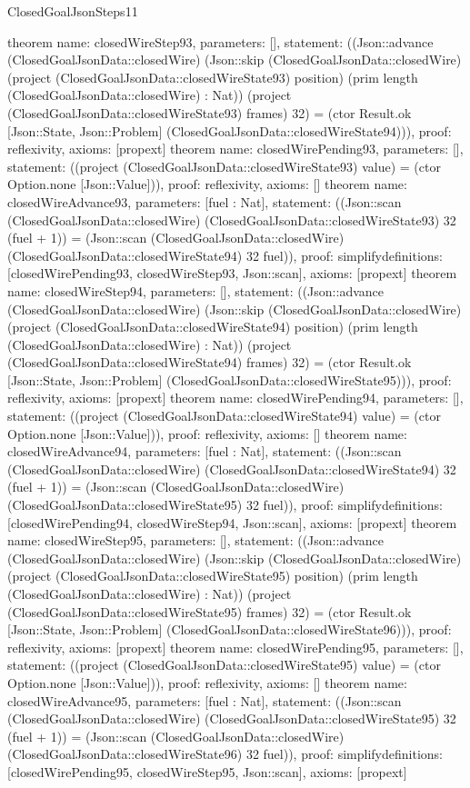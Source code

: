 \begin{lexlean}{ClosedGoalJsonSteps11}
\begin{semanticmodule}
{}
theorem{
 name: closedWireStep93, parameters: [],
 statement: ((Json::advance (ClosedGoalJsonData::closedWire) (Json::skip (ClosedGoalJsonData::closedWire) (project (ClosedGoalJsonData::closedWireState93) position) (prim length (ClosedGoalJsonData::closedWire) : Nat)) (project (ClosedGoalJsonData::closedWireState93) frames) 32) = (ctor Result.ok [Json::State, Json::Problem] (ClosedGoalJsonData::closedWireState94))), proof: reflexivity{}, axioms: [propext]
}
theorem{
 name: closedWirePending93, parameters: [],
 statement: ((project (ClosedGoalJsonData::closedWireState93) value) = (ctor Option.none [Json::Value])), proof: reflexivity{}, axioms: []
}
theorem{
 name: closedWireAdvance93, parameters: [fuel : Nat],
 statement: ((Json::scan (ClosedGoalJsonData::closedWire) (ClosedGoalJsonData::closedWireState93) 32 (fuel + 1)) = (Json::scan (ClosedGoalJsonData::closedWire) (ClosedGoalJsonData::closedWireState94) 32 fuel)), proof: simplify{definitions: [closedWirePending93, closedWireStep93, Json::scan]}, axioms: [propext]
}
theorem{
 name: closedWireStep94, parameters: [],
 statement: ((Json::advance (ClosedGoalJsonData::closedWire) (Json::skip (ClosedGoalJsonData::closedWire) (project (ClosedGoalJsonData::closedWireState94) position) (prim length (ClosedGoalJsonData::closedWire) : Nat)) (project (ClosedGoalJsonData::closedWireState94) frames) 32) = (ctor Result.ok [Json::State, Json::Problem] (ClosedGoalJsonData::closedWireState95))), proof: reflexivity{}, axioms: [propext]
}
theorem{
 name: closedWirePending94, parameters: [],
 statement: ((project (ClosedGoalJsonData::closedWireState94) value) = (ctor Option.none [Json::Value])), proof: reflexivity{}, axioms: []
}
theorem{
 name: closedWireAdvance94, parameters: [fuel : Nat],
 statement: ((Json::scan (ClosedGoalJsonData::closedWire) (ClosedGoalJsonData::closedWireState94) 32 (fuel + 1)) = (Json::scan (ClosedGoalJsonData::closedWire) (ClosedGoalJsonData::closedWireState95) 32 fuel)), proof: simplify{definitions: [closedWirePending94, closedWireStep94, Json::scan]}, axioms: [propext]
}
theorem{
 name: closedWireStep95, parameters: [],
 statement: ((Json::advance (ClosedGoalJsonData::closedWire) (Json::skip (ClosedGoalJsonData::closedWire) (project (ClosedGoalJsonData::closedWireState95) position) (prim length (ClosedGoalJsonData::closedWire) : Nat)) (project (ClosedGoalJsonData::closedWireState95) frames) 32) = (ctor Result.ok [Json::State, Json::Problem] (ClosedGoalJsonData::closedWireState96))), proof: reflexivity{}, axioms: [propext]
}
theorem{
 name: closedWirePending95, parameters: [],
 statement: ((project (ClosedGoalJsonData::closedWireState95) value) = (ctor Option.none [Json::Value])), proof: reflexivity{}, axioms: []
}
theorem{
 name: closedWireAdvance95, parameters: [fuel : Nat],
 statement: ((Json::scan (ClosedGoalJsonData::closedWire) (ClosedGoalJsonData::closedWireState95) 32 (fuel + 1)) = (Json::scan (ClosedGoalJsonData::closedWire) (ClosedGoalJsonData::closedWireState96) 32 fuel)), proof: simplify{definitions: [closedWirePending95, closedWireStep95, Json::scan]}, axioms: [propext]
}
\end{semanticmodule}
\end{lexlean}
